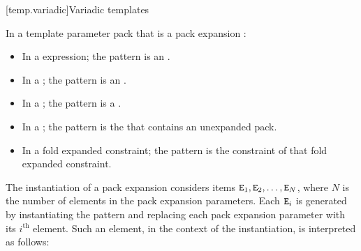 \documentclass{wg21}
\begin{document}
[temp.variadic]{Variadic templates}

In a template parameter pack that is a pack expansion :
\begin{itemize}
\item In a  expression; the pattern is an
.

\item In a ;
the pattern is an .

\item In a ;
the pattern is a .


\item In a ;
the pattern is the 
that contains an unexpanded pack.

\item In a fold expanded constraint;
the pattern is the constraint of that fold expanded constraint.
\end{itemize}

\ednote{[...]}


\pnum
The instantiation of a pack expansion considers
items $\texttt{E}_1, \texttt{E}_2, \dotsc, \texttt{E}_N$,
where
$N$ is the number of elements in the pack expansion parameters.
Each $\texttt{E}_i$ is generated by instantiating the pattern and
replacing each pack expansion parameter with its $i^\text{th}$ element.
Such an element, in the context of the instantiation, is interpreted as
follows:
\end{document}
